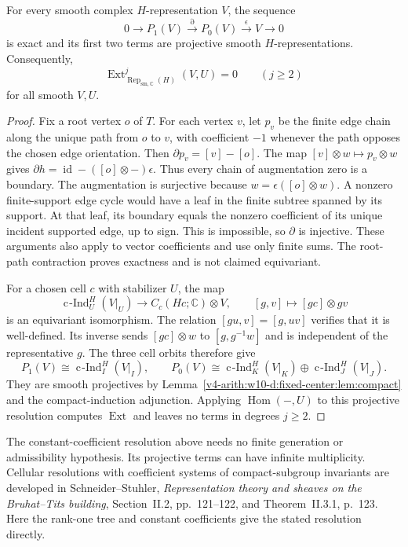 \begin{theorem}\label{v4-arith:w10-d:fixed-center:thm:resolution}
For every smooth complex $H$-representation $V$, the sequence
\begin{equation}\label{v4-arith:w10-d:fixed-center:eq:resolution}
 0\longrightarrow P_1(V)\xrightarrow{\partial}P_0(V)
 \xrightarrow{\epsilon}V\longrightarrow0
\end{equation}
is exact and its first two terms are projective smooth $H$-representations.
Consequently,
\[
 \operatorname{Ext}^j_{\operatorname{Rep}_{\mathrm{sm},\mathbb C}(H)}(V,U)=0
 \qquad(j\ge2)
\]
for all smooth $V,U$.
\end{theorem}
\begin{proof}
Fix a root vertex $o$ of $T$.
For each vertex $v$, let $p_v$ be the finite edge chain along the unique path from $o$ to $v$,
with coefficient $-1$ whenever the path opposes the chosen edge orientation.
Then $\partial p_v=[v]-[o]$.
The map $[v]\otimes w\mapsto p_v\otimes w$ gives
$\partial h=\operatorname{id}-([o]\otimes-)\epsilon$.
Thus every chain of augmentation zero is a boundary.
The augmentation is surjective because $w=\epsilon([o]\otimes w)$.
A nonzero finite-support edge cycle would have a leaf in the finite subtree spanned by its support.
At that leaf, its boundary equals the nonzero coefficient of its unique incident supported edge, up to sign.
This is impossible, so $\partial$ is injective.
These arguments also apply to vector coefficients and use only finite sums.
The root-path contraction proves exactness and is not claimed equivariant.

For a chosen cell $c$ with stabilizer $U$, the map
\[
 \operatorname{c\!\operatorname{-}Ind}_U^H(V|_U)\longrightarrow C_c(Hc;\mathbb C)\otimes V,
 \qquad [g,v]\longmapsto[gc]\otimes gv
\]
is an equivariant isomorphism.
The relation $[gu,v]=[g,uv]$ verifies that it is well-defined.
Its inverse sends $[gc]\otimes w$ to $[g,g^{-1}w]$ and is independent of the representative $g$.
The three cell orbits therefore give
\[
 P_1(V)\cong\operatorname{c\!\operatorname{-}Ind}_I^H(V|_I),\qquad
 P_0(V)\cong\operatorname{c\!\operatorname{-}Ind}_K^H(V|_K)\oplus\operatorname{c\!\operatorname{-}Ind}_J^H(V|_J).
\]
They are smooth projectives by Lemma~\ref{v4-arith:w10-d:fixed-center:lem:compact} and the compact-induction adjunction.
Applying $\operatorname{Hom}(-,U)$ to this projective resolution computes $\operatorname{Ext}$ and leaves no terms in degrees $j\ge2$.
\end{proof}

The constant-coefficient resolution above needs no finite generation or admissibility hypothesis.
Its projective terms can have infinite multiplicity.
Cellular resolutions with coefficient systems of compact-subgroup invariants are developed in
Schneider--Stuhler, \emph{Representation theory and sheaves on the Bruhat--Tits building}, Section~II.2, pp.~121--122, and Theorem~II.3.1, p.~123.
Here the rank-one tree and constant coefficients give the stated resolution directly.


